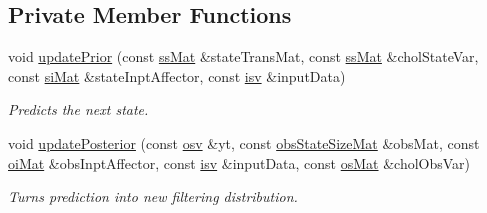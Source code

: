 \subsection*{Private Member Functions}
\begin{DoxyCompactItemize}
\item 
void \hyperlink{classkalman_af4a5d62ffbd478fedfb040cb9e4fcb24}{update\+Prior} (const \hyperlink{classkalman_a581550d9aba33245fb496b22a834831c}{ss\+Mat} \&state\+Trans\+Mat, const \hyperlink{classkalman_a581550d9aba33245fb496b22a834831c}{ss\+Mat} \&chol\+State\+Var, const \hyperlink{classkalman_ab024c795f585385ee14aea92a5dccfbc}{si\+Mat} \&state\+Inpt\+Affector, const \hyperlink{classkalman_abc570ce1b06e8a96a334f9226dfbce77}{isv} \&input\+Data)
\begin{DoxyCompactList}\small\item\em Predicts the next state. \end{DoxyCompactList}\item 
void \hyperlink{classkalman_a74e4c7efe17efc0b7ae6111d4bb53765}{update\+Posterior} (const \hyperlink{classcf__filter_a91d9961b2ecd202b1400c401434b392d}{osv} \&yt, const \hyperlink{classkalman_a13c0f71cc509326e1493982e9f23ebfc}{obs\+State\+Size\+Mat} \&obs\+Mat, const \hyperlink{classkalman_a35298f18f0b699f700e2d55d94bf54fc}{oi\+Mat} \&obs\+Inpt\+Affector, const \hyperlink{classkalman_abc570ce1b06e8a96a334f9226dfbce77}{isv} \&input\+Data, const \hyperlink{classkalman_a28ffd71604fac7b25492b1b43379e046}{os\+Mat} \&chol\+Obs\+Var)
\begin{DoxyCompactList}\small\item\em Turns prediction into new filtering distribution. \end{DoxyCompactList}\end{DoxyCompactItemize}
